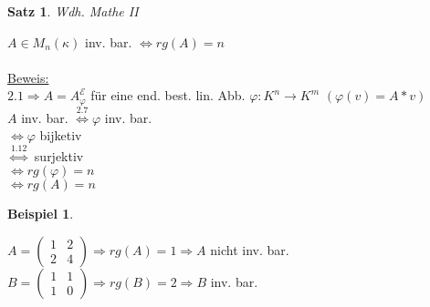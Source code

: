 \documentclass[a4paper,11pt]{article}
\newtheorem{satz}[definition]{Satz}
\newtheorem{bsp}[definition]{Beispiel}
\begin{document}
\begin{satz}
	Wdh. Mathe II
\end{satz}
$A\in M_n(\kappa)$ inv. bar. $\Leftrightarrow rg(A)=n$ \\
\\
\underline{Beweis:} \\
$2.1\Rightarrow A=A^\mathcal{E}_\varphi$ für eine end. best. lin. Abb. $\varphi\colon K^n\to K^m$ $(\varphi(v)=A*v)$ \\
$A$ inv. bar. $\overset{2.7}{\Leftrightarrow}\varphi$ inv. bar. \\
$\Leftrightarrow\varphi$ bijketiv \\
$\overset{1.12}{\Leftrightarrow}$ surjektiv \\
$\Leftrightarrow rg(\varphi)=n$ \\
$\Leftrightarrow rg(A)=n$

\begin{bsp}
\end{bsp}
$A=\begin{pmatrix}1&2\\2&4\end{pmatrix}\Rightarrow rg(A)=1\Rightarrow A$ nicht inv. bar. \\
$B=\begin{pmatrix}1&1\\1&0\end{pmatrix}\Rightarrow rg(B)=2\Rightarrow B$ inv. bar.

\newpage
\end{document}
